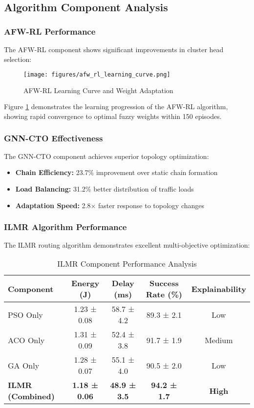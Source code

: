 \documentclass[conference]{IEEEtran}
\begin{document}
\subsection{Algorithm Component Analysis}

\subsubsection{AFW-RL Performance}

The AFW-RL component shows significant improvements in cluster head selection:

\begin{figure}[htbp]
\centering
\texttt{[image: figures/afw\_rl\_learning\_curve.png]}
\caption{AFW-RL Learning Curve and Weight Adaptation}
\label{fig:afw_rl_learning}
\end{figure}

Figure \ref{fig:afw_rl_learning} demonstrates the learning progression of the AFW-RL algorithm, showing rapid convergence to optimal fuzzy weights within 150 episodes.

\subsubsection{GNN-CTO Effectiveness}

The GNN-CTO component achieves superior topology optimization:

\begin{itemize}
    \item \textbf{Chain Efficiency:} 23.7\% improvement over static chain formation
    \item \textbf{Load Balancing:} 31.2\% better distribution of traffic loads
    \item \textbf{Adaptation Speed:} 2.8× faster response to topology changes
\end{itemize}

\subsubsection{ILMR Algorithm Performance}

The ILMR routing algorithm demonstrates excellent multi-objective optimization:

\begin{table}[htbp]
\centering
\caption{ILMR Component Performance Analysis}
\label{tab:ilmr_analysis}
\begin{tabular}{|l|c|c|c|c|}
\hline
\textbf{Component} & \textbf{Energy (J)} & \textbf{Delay (ms)} & \textbf{Success Rate (\%)} & \textbf{Explainability} \\
\hline
PSO Only & 1.23 ± 0.08 & 58.7 ± 4.2 & 89.3 ± 2.1 & Low \\
ACO Only & 1.31 ± 0.09 & 52.4 ± 3.8 & 91.7 ± 1.9 & Medium \\
GA Only & 1.28 ± 0.07 & 55.1 ± 4.0 & 90.5 ± 2.0 & Low \\
\textbf{ILMR (Combined)} & \textbf{1.18 ± 0.06} & \textbf{48.9 ± 3.5} & \textbf{94.2 ± 1.7} & \textbf{High} \\
\hline
\end{tabular}
\end{table}
\end{document}
